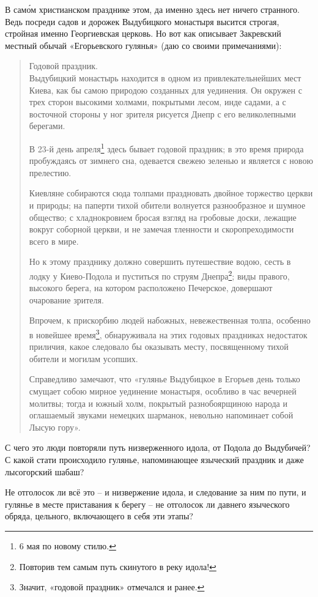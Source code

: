 \documentclass[a5paper,11pt,openany]{article}
\begin{document}
В сам\'ом христианском празднике этом, да именно здесь нет ничего странного. Ведь посреди садов и дорожек Выдубицкого монастыря высится строгая, стройная именно Георгиевская церковь. Но вот как описывает Закревский местный обычай «Егорьевского гулянья» (даю со своими примечаниями):

\begin{quotation}
Годовой праздник.\\

Выдубицкий монастырь находится в одном из привлекательнейших мест Киева, как бы самою природою созданных для уединения. Он окружен с трех сторон высокими холмами, покрытыми лесом, инде садами, а с восточной стороны у ног зрителя рисуется Днепр с его великолепными берегами.

В 23-й день апреля\footnote{6 мая по новому стилю.} здесь бывает годовой праздник; в это время природа пробуждаясь от зимнего сна, одевается свежею зеленью и является с новою прелестию. 

Киевляне собираются сюда толпами праздновать двойное торжество церкви и природы; на паперти тихой обители волнуется разнообразное и шумное общество; с хладнокровием бросая взгляд на гробовые доски, лежащие вокруг соборной церкви, и не замечая тленности и скоропреходимости всего в мире.

Но к этому празднику должно совершить путешествие водою, сесть в лодку у Киево-Подола и пуститься по струям Днепра\footnote{Повторив тем самым путь скинутого в реку идола!}; виды правого, высокого берега, на котором расположено Печерское, довершают очарование зрителя.

Впрочем, к прискорбию людей набожных, невежественная толпа, особенно в новейшее время\footnote{Значит, «годовой праздник» отмечался и ранее.}, обнаруживала на этих годовых праздниках недостаток приличия, какое следовало бы оказывать месту, посвященному тихой обители и могилам усопших.

Справедливо замечают, что «гулянье Выдубицкое в Егорьев день только смущает собою мирное уединение монастыря, особливо в час вечерней молитвы; тогда и южный холм, покрытый разнобоярщиною народа и оглашаемый звуками немецких шарманок, невольно напоминает собой Лысую гору».
\end{quotation}

   С чего это люди повторяли путь низверженного идола, от Подола до Выдубичей? С какой стати происходило гулянье, напоминающее языческий праздник и даже лысогорский шабаш?

   Не отголосок ли всё это – и низвержение идола, и следование за ним по пути, и гулянье в месте приставания к берегу – не отголосок ли давнего языческого обряда, цельного, включающего в себя эти этапы?
\end{document}
